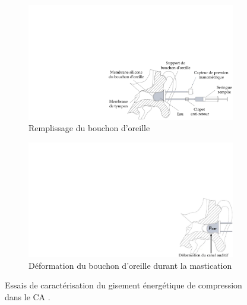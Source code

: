 \begin{figure}[!htbp]
\begin{center}
	\begin{subfigure}[t]{0.66\textwidth}
    	\captionsetup{justification=centering}
		\includegraphics[trim={13.2cm 0cm 0cm 9.4cm},clip,width=\textwidth]{../Chap2/Figure/Bouchard_BDT.pdf}
		\caption{Remplissage du bouchon d'oreille}
		\label{fig:Bouchard_BDT}
	\end{subfigure}
\hfillx
	\begin{subfigure}[t]{0.28\textwidth}
    	\captionsetup{justification=centering}
		\includegraphics[trim={24.8cm 0cm 0cm 9cm},clip,width=\textwidth]{../Chap2/Figure/Bouchard_essais.pdf}
		\caption{Déformation du bouchon d'oreille durant la mastication}
		\label{fig:Bouchard_essais}  
	\end{subfigure}
	\caption{Essais de caractérisation du gisement énergétique de compression dans le CA \cite{Bouchard-Roy2020}.}
	\label{fig:Bouchard-Roy2020_gisement_compression}
\end{center}	
\end{figure} 

